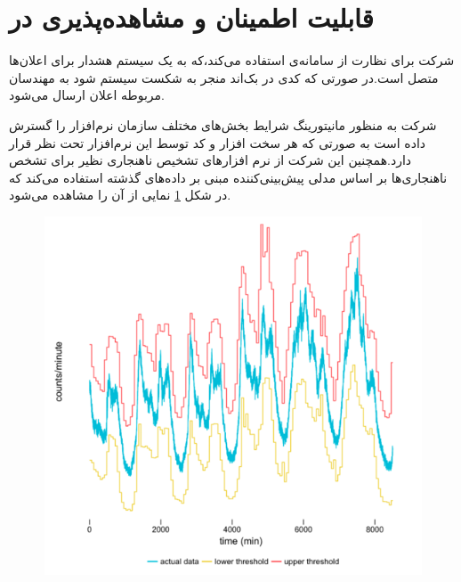 \section{قابلیت اطمینان و مشاهده‌پذیری در }
شرکت  برای نظارت از سامانه‌ی \cite{Nagios} استفاده می‌کند،که به یک سیستم هشدار برای اعلان‌ها متصل است.در صورتی که کدی در بک‌اند منجر به شکست سیستم شود به مهندسان مربوطه اعلان ارسال می‌شود.


شرکت  به منظور مانیتورینگ شرایط بخش‌های مختلف سازمان نرم‌افزار \cite{m3} را گسترش داده است به صورتی که هر سخت افزار و کد توسط این نرم‌افزار تحت نظر قرار دارد.همچنین این شرکت از نرم افزار‌های تشخیص ناهنجاری نظیر \cite{argos} برای تشخص ناهنجاری‌ها بر اساس مدلی پیش‌بینی‌کننده مبنی بر داده‌های گذشته استفاده می‌کند که در شکل \ref{fig:argos} نمایی از آن را مشاهده می‌شود.

\begin{figure}[h]
\centering
\includegraphics[scale=0.5]{argos.png}
\caption{}
\label{fig:argos}
\end{figure}


